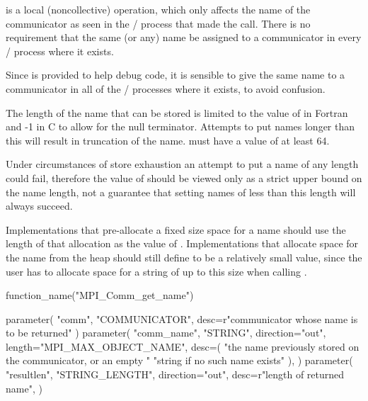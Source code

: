  is a local (noncollective) operation,
which only affects the name of the communicator as seen in the \MPI/ process
that made the  call. There is no
requirement that the same (or any) name be assigned to a communicator
in every \MPI/ process where it exists.

\begin{users}
Since  is provided to help debug code, it
is sensible to give the same name to a communicator in all of the
\MPI/ processes where it exists, to avoid confusion.
\end{users}

The length of the name that can be stored is limited to the value of
 in Fortran and
-1 in C to allow for the null terminator.
Attempts to put names longer than this
will result in truncation of the name.
 must have a value of at least 64.

\begin{users}
Under circumstances of store exhaustion an attempt to put a
name of any length could fail, therefore the value of
 should be viewed only as a strict upper
bound on the name length, not a guarantee that setting names of less
than this length will always succeed.
\end{users}

\begin{implementors}
Implementations that pre-allocate a fixed size space for a name
should use the length of that allocation as the value of
.
Implementations that allocate space for the name from the heap should
still define  to be a relatively small
value, since the user has to allocate space for a string of up to this
size when calling .
\end{implementors}

\begin{mpi-binding}
    function_name("MPI_Comm_get_name")
    
    parameter(
        "comm", "COMMUNICATOR", desc=r"communicator whose name is to be returned"
    )
    parameter(
        "comm_name",
        "STRING",
        direction="out",
        length="MPI_MAX_OBJECT_NAME",
        desc=(
            "the name previously stored on the communicator, or an empty "
            "string if no such name exists"
        ),
    )
    parameter(
        "resultlen",
        "STRING_LENGTH",
        direction="out",
        desc=r"length of returned name",
    )
\end{mpi-binding}

